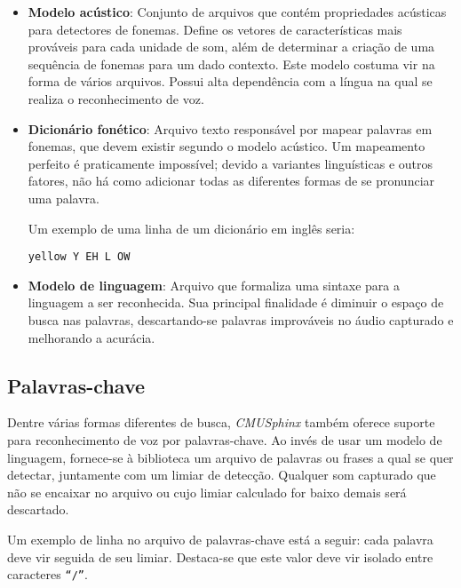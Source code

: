 \begin{itemize}
\item \textbf{Modelo acústico}: Conjunto de arquivos que contém propriedades acústicas para detectores de fonemas. Define os vetores de características mais prováveis para cada unidade de som, além de determinar a criação de uma sequência de fonemas para um dado contexto. Este modelo costuma vir na forma de vários arquivos. Possui alta dependência com a língua na qual se realiza o reconhecimento de voz.

\item \textbf{Dicionário fonético}: Arquivo texto responsável por mapear palavras em fonemas, que devem existir segundo o modelo acústico. Um mapeamento perfeito é praticamente impossível; devido a variantes linguísticas e outros fatores, não há como adicionar todas as diferentes formas de se pronunciar uma palavra.

Um exemplo de uma linha de um dicionário em inglês seria:

\begin{center}
\texttt{yellow Y EH L OW}
\end{center}

\item \textbf{Modelo de linguagem}: Arquivo que formaliza uma sintaxe para a linguagem a ser reconhecida. Sua principal finalidade é diminuir o espaço de busca nas palavras, descartando-se palavras improváveis no áudio capturado e melhorando a acurácia.
\end{itemize}


\subsection{Palavras-chave}
\label{pocketsphinx-keywords}

Dentre várias formas diferentes de busca, \textit{CMUSphinx} também oferece suporte para reconhecimento de voz por palavras-chave. Ao invés de usar um modelo de linguagem, fornece-se à biblioteca um arquivo de palavras ou frases a qual se quer detectar, juntamente com um limiar de detecção. Qualquer som capturado que não se encaixar no arquivo ou cujo limiar calculado for baixo demais será descartado.

Um exemplo de linha no arquivo de palavras-chave está a seguir: cada palavra deve vir seguida de seu limiar. Destaca-se que este valor deve vir isolado entre caracteres \texttt{``/''}.

